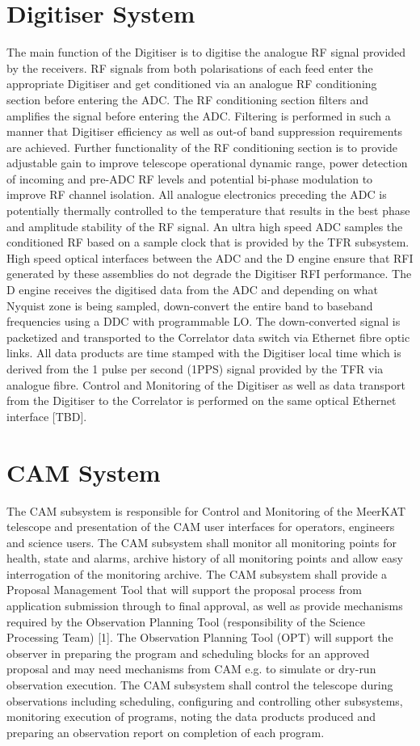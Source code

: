 \section{Digitiser System}
The main function of the Digitiser\cite{DIG} is to digitise the analogue RF signal provided by the receivers. RF signals from both polarisations of each feed enter the appropriate Digitiser and get conditioned via an analogue RF conditioning section before entering the ADC. 
The RF conditioning section filters and amplifies the signal before entering the ADC. Filtering is performed in such a manner that Digitiser efficiency as well as out-of band suppression requirements are achieved. 
Further functionality of the RF conditioning section is to provide adjustable gain to improve telescope operational dynamic range, power detection of incoming and pre-ADC RF levels and potential bi-phase modulation to improve RF channel isolation. All analogue electronics preceding the ADC is potentially thermally controlled to the temperature that results in the best phase and amplitude stability of the RF signal. An ultra high speed ADC samples the conditioned RF based on a sample clock that is provided by the TFR subsystem.
High speed optical interfaces between the ADC and the D engine ensure that RFI generated by these assemblies do not degrade the Digitiser RFI performance.
The D engine receives the digitised data from the ADC and depending on what Nyquist zone is being sampled, down-convert the entire band to baseband frequencies using a DDC with programmable LO.  The down-converted signal is packetized and transported to the Correlator data switch via Ethernet fibre optic links. All data products are time stamped with the Digitiser local time which is derived from the 1 pulse per second (1PPS) signal provided by the TFR via analogue fibre. Control and Monitoring of the Digitiser as well as data transport from the Digitiser to the Correlator is performed on the same optical Ethernet interface [TBD].
\section{ CAM System}
The CAM subsystem\cite{CAM} is responsible for Control and Monitoring of the MeerKAT telescope and presentation of the CAM user interfaces for operators, engineers and science users.
The CAM subsystem shall monitor all monitoring points for health, state and alarms, archive history of all monitoring points and allow easy interrogation of the monitoring archive.
The CAM subsystem shall provide a Proposal Management Tool that will support the proposal process from application submission through to final approval, 
as well as provide mechanisms required by the Observation Planning Tool (responsibility of the Science Processing Team) [1]. 
The Observation Planning Tool (OPT) will support the observer in preparing the program and scheduling blocks for an approved proposal and may need mechanisms from CAM e.g. to simulate or dry-run observation execution.
The CAM subsystem shall control the telescope during observations including scheduling, configuring and controlling other subsystems, monitoring execution of programs, 
noting the data products produced and preparing an observation report on completion of each program.
